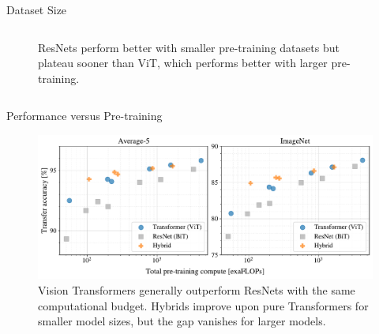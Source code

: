 \begin{frame}{Dataset Size}
\begin{columns}
\begin{column}{0.5\textwidth}
\begin{figure}
                \caption{
                ResNets perform better with smaller pre-training datasets but plateau sooner than ViT, which performs better with larger pre-training. 
                }
                \label{fig:imagenet_5shot}
            \end{figure}
        \end{column}
    \end{columns}
\end{frame}


\begin{frame}{Performance versus Pre-training}
    \begin{figure}
        \centering
        \includegraphics[width=0.9\linewidth]{pic/finetune_vs_compute2.pdf}
        \caption{Vision Transformers generally outperform ResNets with the same computational budget. Hybrids improve upon pure Transformers for smaller model sizes, but the gap vanishes for larger models.}
        \label{fig:enter-label}
    \end{figure}
\end{frame}